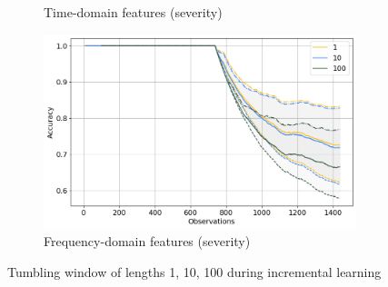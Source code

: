 \begin{figure}[]
\begin{subfigure}[b]{0.48\textwidth}
        \caption{Time-domain features (severity)}
    \end{subfigure}
    \hfill
    \begin{subfigure}[b]{0.48\textwidth}
        \includegraphics[width=\textwidth]{assets/results/incremental-learning/tumbling-FD-severity.png}
        \caption{Frequency-domain features (severity)}
    \end{subfigure} 
    \caption{Tumbling window of lengths 1, 10, 100 during incremental learning}
    \label{fig:evaluation:tumbling-window-online}
\end{figure}

